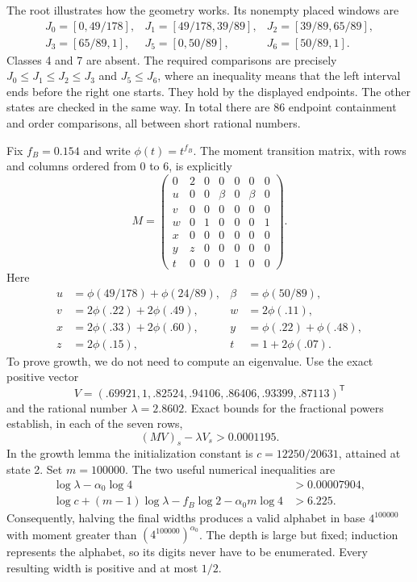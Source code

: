 \documentclass[11pt]{article}
\theoremstyle{definition}
\theoremstyle{remark}
\newcommand{\al}{\alpha_0}
\begin{document}
The root illustrates how the geometry works. Its nonempty placed windows
are
\[
\begin{array}{lll}
 J_0=[0,49/178],&J_1=[49/178,39/89],&J_2=[39/89,65/89],\\
 J_3=[65/89,1],&J_5=[0,50/89],&J_6=[50/89,1].
\end{array}
\]
Classes 4 and 7 are absent. The required comparisons are precisely
$J_0\le J_1\le J_2\le J_3$ and $J_5\le J_6$, where an inequality
means that the left interval ends before the right one starts.
They hold by the displayed endpoints. The other states are checked in
the same way. In total there are 86 endpoint containment and order
comparisons, all between short rational numbers.

Fix $f_B=0.154$ and write $\phi(t)=t^{f_B}$. The moment transition matrix,
with rows and columns ordered from 0 to 6, is explicitly
\[
 M=\begin{pmatrix}
 0&2&0&0&0&0&0\\
 u&0&0&\beta&0&\beta&0\\
 v&0&0&0&0&0&0\\
 w&0&1&0&0&0&1\\
 x&0&0&0&0&0&0\\
 y&z&0&0&0&0&0\\
 t&0&0&0&1&0&0
 \end{pmatrix}.
\]
Here
\[
\begin{aligned}
 u&=\phi(49/178)+\phi(24/89),&\beta&=\phi(50/89),\\
 v&=2\phi(.22)+2\phi(.49),&w&=2\phi(.11),\\
 x&=2\phi(.33)+2\phi(.60),&y&=\phi(.22)+\phi(.48),\\
 z&=2\phi(.15),&t&=1+2\phi(.07).
\end{aligned}
\]
To prove growth, we do not need to compute an eigenvalue. Use the exact
positive vector
\begin{equation}\label{eq:vector}
 V=(.69921,1,.82524,.94106,.86406,.93399,.87113)^{\mathsf T}
\end{equation}
and the rational number $\lambda=2.8602$. Exact bounds for the fractional
powers establish, in each of the seven rows,
\begin{equation}\label{eq:rowmargin}
 (MV)_s-\lambda V_s>0.0001195.
\end{equation}
In the growth lemma the initialization constant is
$c=12250/20631$, attained at state 2. Set $m=100000$. The two useful
numerical inequalities are
\begin{align}
 \log\lambda-\al\log4&>0.00007904,\label{eq:growthmargin}\\
 \log c+(m-1)\log\lambda-f_B\log2-\al m\log4&>6.225.
 \label{eq:depthmargin}
\end{align}
Consequently, halving the final widths produces a valid alphabet in
base $4^{100000}$ with moment greater than $(4^{100000})^{\al}$.
The depth is large but fixed; induction represents the alphabet, so its
digits never have to be enumerated. Every resulting width is positive
and at most $1/2$.
\end{document}
